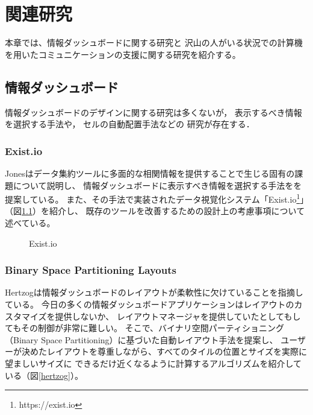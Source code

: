 \chapter{関連研究}
\label{chap:relevant}

本章では、情報ダッシュボードに関する研究と
沢山の人がいる状況での計算機を用いたコミュニケーションの支援に関する研究を紹介する。

\newpage

\section{情報ダッシュボード}
\label{chap:dashboard}

情報ダッシュボードのデザイン\cite{few}に関する研究は多くないが，
表示するべき情報を選択する手法\cite{Jones:2015:ECI:2800835.2800963}や，
セルの自動配置手法\cite{Hertzog:2015:BSP:2678025.2701383}などの
研究が存在する．

\subsection{Exist.io}
Jonesはデータ集約ツールに多面的な相関情報を提供することで生じる固有の課題について説明し、
情報ダッシュボードに表示すべき情報を選択する手法をを提案している。
また、その手法で実装されたデータ視覚化システム「Exist.io\footnote{https://exist.io}」（図\ref{existio}）を紹介し、
既存のツールを改善するための設計上の考慮事項について述べている。

\begin{figure}[H]
\centering
{}
\caption{Exist.io}
\label{existio}
\end{figure}

\subsection{Binary Space Partitioning Layouts}
Hertzogは情報ダッシュボードのレイアウトが柔軟性に欠けていることを指摘している\cite{Hertzog:2015:BSP:2678025.2701383}。
今日の多くの情報ダッシュボードアプリケーションはレイアウトのカスタマイズを提供しないか、
レイアウトマネージャを提供していたとしてもしてもその制御が非常に難しい。
そこで、バイナリ空間パーティショニング（Binary Space Partitioning）に基づいた自動レイアウト手法を提案し、
ユーザーが決めたレイアウトを尊重しながら、すべてのタイルの位置とサイズを実際に望ましいサイズに
できるだけ近くなるように計算するアルゴリズムを紹介している（図\ref{hertzog}）。


